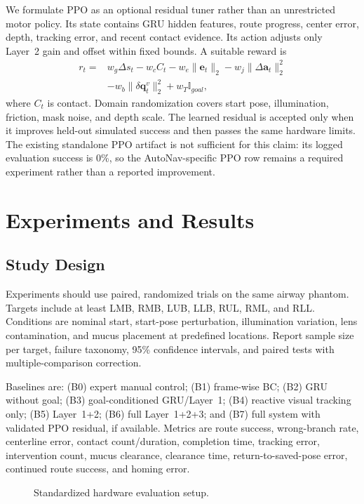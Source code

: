 \documentclass[letterpaper,10pt,conference]{ieeeconf}
\newcommand{\act}{\mathbf{a}}
\begin{document}
We formulate PPO as an optional residual tuner rather than an unrestricted
motor policy. Its state contains GRU hidden features, route progress, center
error, depth, tracking error, and recent contact evidence. Its action adjusts
only Layer~2 gain and offset within fixed bounds. A suitable reward is
\begin{align}
 r_t={}&w_g\Delta s_t-w_c C_t-w_e\|\mathbf e_t\|_2
 -w_j\|\Delta\act_t\|_2^2\nonumber\\
 &-w_b\|\delta\mathbf q^v_t\|_2^2+w_T\mathbb I_{goal},
\end{align}
where $C_t$ is contact. Domain randomization covers start pose, illumination,
friction, mask noise, and depth scale. The learned residual is accepted only
when it improves held-out simulated success and then passes the same hardware
limits. The existing standalone PPO artifact is not sufficient for this claim:
its logged evaluation success is 0\%, so the AutoNav-specific PPO row remains a
required experiment rather than a reported improvement.

\section{Experiments and Results}

\subsection{Study Design}

Experiments should use paired, randomized trials on the same airway phantom.
Targets include at least LMB, RMB, LUB, LLB, RUL, RML, and RLL. Conditions are
nominal start, start-pose perturbation, illumination variation, lens
contamination, and mucus placement at predefined locations. Report sample size
per target, failure taxonomy, 95\% confidence intervals, and paired tests with
multiple-comparison correction.

Baselines are: (B0) expert manual control; (B1) frame-wise BC; (B2) GRU without
goal; (B3) goal-conditioned GRU/Layer~1; (B4) reactive visual tracking only;
(B5) Layer~1+2; (B6) full Layer~1+2+3; and (B7) full system with validated PPO
residual, if available. Metrics are route success, wrong-branch rate, centerline
error, contact count/duration, completion time, tracking error, intervention
count, mucus clearance, clearance time, return-to-saved-pose error, continued
route success, and homing error.

\begin{figure}[t]
\centering
{}
\caption{Standardized hardware evaluation setup.}
\label{fig:setup}
\end{figure}
\end{document}
